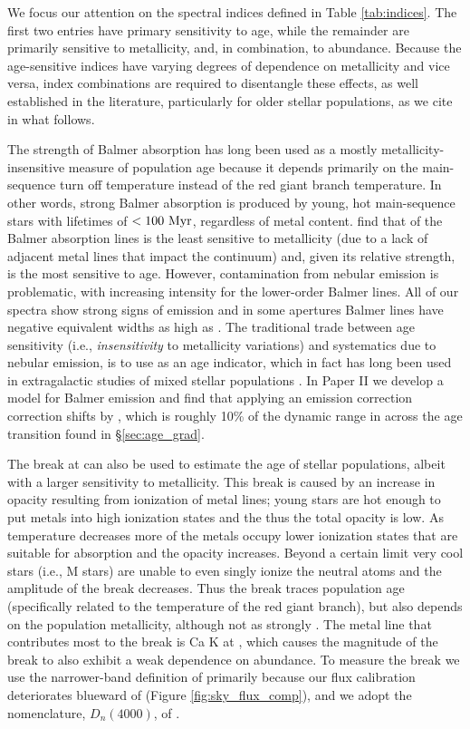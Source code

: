 We focus our attention on the spectral indices defined in Table
\ref{tab:indices}. The first two entries have primary sensitivity to
age, while the remainder are primarily sensitive to metallicity, and,
in combination, to abundance. Because the age-sensitive indices have
varying degrees of dependence on metallicity and vice versa, index
combinations are required to disentangle these effects, as well
established in the literature, particularly for older stellar
populations, as we cite in what follows.

The strength of Balmer absorption has long been used as a mostly
metallicity-insensitive measure of population age because it depends
primarily on the main-sequence turn off temperature instead of the red
giant branch temperature. In other words, strong Balmer absorption is
produced by young, hot main-sequence stars with lifetimes of
$<100~\mathrm{Myr} $, regardless of metal content. \citet{Worthey97} find
that of the Balmer absorption lines \HB is the least sensitive to
metallicity (due to a lack of adjacent metal lines that impact the
continuum) and, given its relative strength, is the most sensitive to
age.  However, contamination from nebular emission is problematic,
with increasing intensity for the lower-order Balmer lines.  All of
our spectra show strong signs of \Ha emission and in some apertures
Balmer lines have negative equivalent widths as high as \Hg.  The
traditional trade between age sensitivity (i.e., \emph{insensitivity}
to metallicity variations) and systematics due to nebular emission, is
to use \Hda \citep{Worthey97} as an age indicator, which in fact has
long been used in extragalactic studies of mixed stellar populations
\citep[e.g.,][]{Couch87}. In Paper II we develop a model for Balmer
emission and find that applying an emission correction correction
shifts \Hda by , which is roughly 10\% of the
dynamic range in \Hda across the age transition found in
\S\ref{sec:age_grad}.

The break at  can also be used to estimate the age of
stellar populations, albeit with a larger sensitivity to
metallicity. This break is caused by an increase in opacity resulting
from ionization of metal lines; young stars are hot enough to put
metals into high ionization states and the thus the total opacity is
low. As temperature decreases more of the metals occupy lower
ionization states that are suitable for absorption and the opacity
increases. Beyond a certain limit very cool stars (i.e., M stars) are
unable to even singly ionize the neutral atoms and the amplitude of
the break decreases. Thus the  break traces population
age (specifically related to the temperature of the red giant branch),
but also depends on the population metallicity, although not as
strongly \citep[see][and Figure \ref{fig:D4000_cuts} here]{Bruzual83}.
The metal line that contributes most to the  break is
Ca K at , which causes the magnitude of the break to
also exhibit a weak dependence on abundance. To measure the
 break we use the narrower-band definition of
\citet{Balogh99} primarily because our flux calibration deteriorates
blueward of  (Figure \ref{fig:sky_flux_comp}), and we
adopt the nomenclature, $D_n(4000)$, of \citet{Kauffmann03}.

